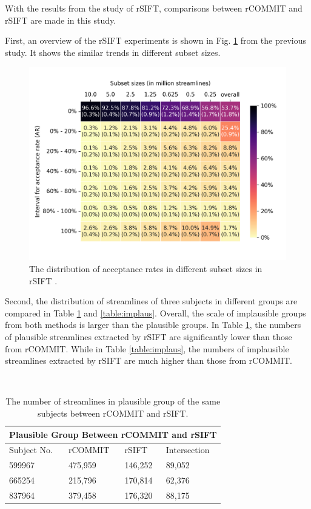 With the results from the study of rSIFT, comparisons between rCOMMIT and rSIFT are made in this study. 

First, an overview of the rSIFT \cite{hainAssessingStreamlinePlausibility2022} experiments is shown 
in Fig. \ref{fig:heatmap_sift} from the previous study. It shows the similar trends in different subset sizes. 


\begin{figure}[ht]
    \centering
    \includegraphics[width= 12cm]{figures/table_rsift.png}
        \caption{The distribution of acceptance rates in different subset sizes in rSIFT \cite{hainAssessingStreamlinePlausibility2022}.
        }
    \label{fig:heatmap_sift}
\end{figure}


Second, the distribution of streamlines of three subjects in different groups are compared in Table \ref*{table:plaus} and \ref*{table:implaus}.
Overall, the scale of implausible groups from both methods is larger than the plausible groups.
In Table \ref*{table:plaus}, the numbers of plausible streamlines extracted by rSIFT are significantly lower than those from rCOMMIT.
While in Table \ref*{table:implaus}, the numbers of implausible streamlines extracted by rSIFT are much higher than those from rCOMMIT.
\begin{table}[!ht]
    \centering
    \caption{The number of streamlines in plausible group of the same subjects between rCOMMIT and rSIFT.}
    ~\\
    \label{table:plaus}
    \begin{tabular}{p{3cm}|p{3cm}|p{3cm}|p{3cm}}
    \toprule
    \multicolumn{4}{c}{\textbf{Plausible Group Between rCOMMIT and rSIFT}} \\
    \toprule
    Subject No. & rCOMMIT & rSIFT & Intersection \\
    \hline
    599967 & 475,959 &146,252 & 89,052 \\
    \hline
    665254 & 215,796 &170,814 & 62,376 \\
    \hline
    837964 & 379,458 &176,320 & 88,175 \\
    \bottomrule
    \end{tabular}
\end{table}

